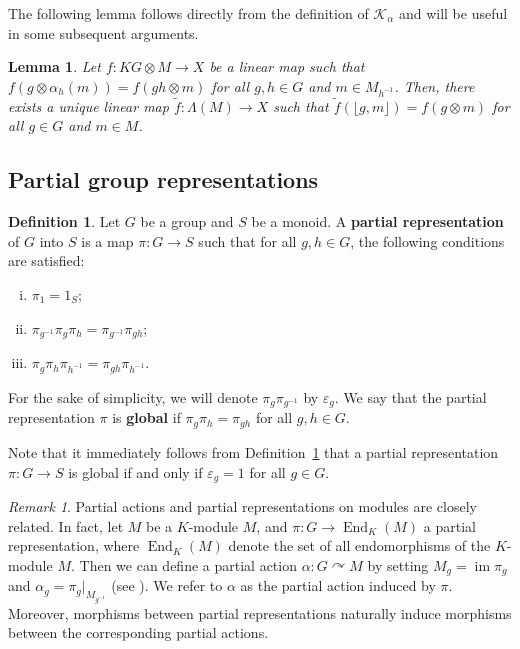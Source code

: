 \documentclass[11pt]{amsart}
\numberwithin{equation}{section}
\newtheorem{lemma}[theorem]{Lemma}
\theoremstyle{definition}
\newtheorem{definition}[theorem]{Definition}
\theoremstyle{remark}
\newtheorem{remark}[theorem]{Remark}
\newcommand*{\im}{\operatorname{im}} %
\begin{document}
The following lemma follows directly from the definition of \(\mathcal{K}_{\alpha}\)  and will be useful in some subsequent arguments. 

\begin{lemma}\label{l: computation tool for Lambda}
    Let \(f: KG \otimes M \to X\) be a linear map such that \(f(g \otimes \alpha_{h}(m)) = f(gh \otimes m)\) for all \(g, h \in G\) and \(m \in M_{h^{-1}}\). Then, there exists a unique linear map \(\widetilde{f}: \Lambda(M) \to X\) such that \(\widetilde{f}(\lfloor g, m \rfloor) = f(g \otimes m)\) for all \(g \in G\) and \(m \in M\).
\end{lemma}


\subsection{Partial group representations}

\begin{definition}\label{d: partial representation}
    Let \(G\) be a group and \(S\) be a monoid.
    A {\bf partial representation} of \(G\) into \(S\) is a map \(\pi: G \to S\) such that for all \(g, h \in G\), the following conditions are satisfied:
    \begin{enumerate}[(i)]
        \item \(\pi_1 = 1_S\); 
        \item \(\pi_{g^{-1}}\pi_{g}\pi_{h} = \pi_{g^{-1}}\pi_{gh}\);
        \item \(\pi_{g}\pi_{h}\pi_{h^{-1}} = \pi_{gh}\pi_{h^{-1}}\).
    \end{enumerate}
    For the sake of simplicity, we will denote \(\pi_g \pi_{g^{-1}}\) by \(\varepsilon_g\).
   We say that the partial representation $\pi $ is {\bf global} if 
     \( \pi_{g}\pi_{h} = \pi_{gh}\) for all $g,h \in G.$
\end{definition}

 Note that it immediately follows from Definition~\ref{d: partial representation} that  a partial representation
\(\pi: G \to S\) is global if and only if   
\(\varepsilon_g =1\) for all $g\in G.$


\begin{remark}\label{r: partial actions induced by partial representations}
    Partial actions and partial representations on modules are closely related.
    In fact, let $M$ be a $K$-module $M$, and  \(\pi: G \to \operatorname{End}_{K}(M)\) a partial representation,  where $\operatorname{End}_K(M)$ denote the set of all endomorphisms of the $K$-module $M$. Then we can define a partial action \(\alpha: G \curvearrowright M\) by setting \(M_g = \im \pi_g\) and \(\alpha_g = \pi_g|_{M_{g^{-1}}}\)  (see \cite[Example 2.3]{Article_Jerez_2024_OTHOPGA}).
    We refer to \(\alpha\) as the partial action induced by \(\pi\).
    Moreover, morphisms between partial representations naturally induce morphisms between the corresponding partial actions.
\end{remark}
\end{document}
